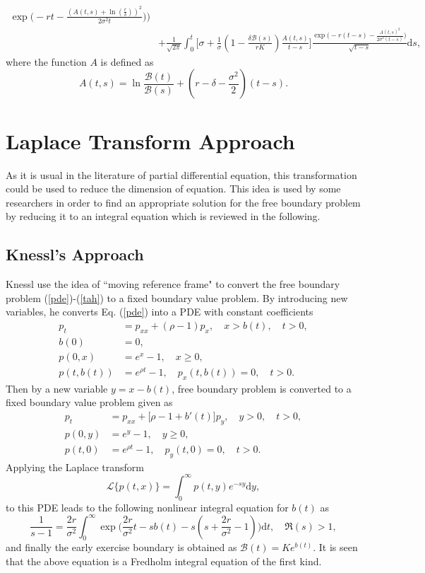 \documentclass[fleqn,final,3p,11pt]{elsarticle}
\theoremstyle{definition}
\theoremstyle{remark}
\numberwithin{equation}{section}
\begin{document}
\begin{appendices}
\begin{equation}
\begin{split}
\exp \Big(  -rt - \frac{(A(t,s)+ \ln(\frac{r}{\delta}))^{2}}{2 \sigma^{2}t} \Big)\Big)  \\
& + \frac{1}{\sqrt{2 \pi}}\int_{0}^{t} \Big[  \sigma + \frac{1}{\sigma}
(1 - \frac{\delta \mathcal{B}(s)}{r K})\frac{A(t,s)}{t-s} \Big] \frac{\exp \Big( -r (t-s) - \frac{A(t,s)^{2}}{2 \sigma^{2}(t-s)}\Big)}{\sqrt{t-s}}\mathrm{d}s,
\end{split}
\end{equation}
where the function $A$ is defined as
\[A(t,s) = \ln \frac{\mathcal{B}(t)}{\mathcal{B}(s)} +  \left(   r- \delta - \frac{\sigma^{2}}{2}\right) \left( t-s\right). \]
\section{Laplace Transform Approach}\label{laplas}
 As it is usual in the literature of partial differential equation, this transformation could be used to reduce the dimension of equation. This idea is used by some researchers in order to find an appropriate solution for the free boundary problem by reducing it to an integral equation which is reviewed in the following.
\subsection{Knessl's Approach} Knessl \cite{knessl} use the idea of ``moving reference frame" to convert the free boundary problem (\ref{pde})-(\ref{tah}) to a fixed boundary value problem.
By introducing new variables, he converts Eq. (\ref{pde}) into a PDE with constant coefficients
\begin{align}
p_{t}&=p_{xx}+(\rho -1)p_{x}, \quad x>b(t), \quad t>0,\\
b(0)&=0,\\
p(0,x)&=e^{x}-1, \quad x\geq 0,\\
p(t,b(t))&=e^{\rho t}-1, \quad p_{x}(t,b(t))=0, \quad t>0.
\end{align}
Then by a new variable $y=x-b(t)$, free boundary problem is converted to a fixed boundary value problem given as
\begin{align}
p_{t}&=p_{xx}+\Big[\rho-1+b'(t)\Big]p_{y}, \quad y>0, \quad t>0,\\
p(0,y)&=e^{y}-1, \quad y\geq0,\\
p(t,0)&=e^{\rho t}-1, \quad p_{y}(t,0)=0, \quad t>0.
\end{align}
Applying the Laplace transform
\[\mathcal{L}\{p(t,x)\} = \int_{0}^{\infty} p(t,y)e^{-sy}\mathrm{d}y,\]
to this PDE leads to the following nonlinear integral equation for $b(t)$ as
\begin{equation}\label{bb1}
\frac{1}{s-1} = \frac{2r}{\sigma^{2}}\int_{0}^{\infty} \exp \Big(\frac{2r}{\sigma^{2}} t -s {b}(t) -s (s + \frac{2r}{\sigma^{2}} -1) \Big) \mathrm{d}t, \quad \Re (s) > 1,  \end{equation}
and finally the early exercise boundary is obtained as $\mathcal{B}(t)=K e^{b(t)}$. It is seen that the above equation  is a Fredholm integral equation of the first kind.

\end{appendices}
\end{document}
